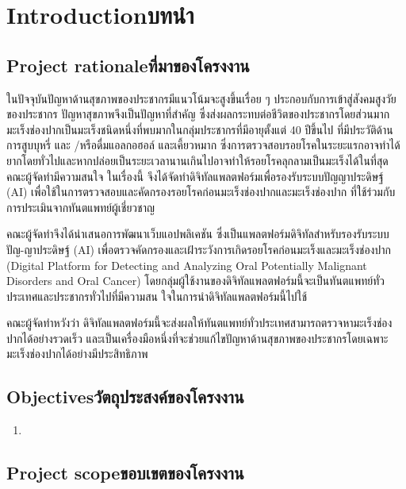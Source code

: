 \chapter{\ifenglish Introduction\else บทนำ\fi}

\section{\ifenglish Project rationale\else ที่มาของโครงงาน\fi}

ในปัจจุบันปัญหาด้านสุขภาพของประชากรมีแนวโน้มจะสูงขึ้นเรื่อย ๆ ประกอบกับการเข้าสู่สังคมสูงวัยของประชากร ปัญหาสุขภาพจึงเป็นปัญหาที่สำคัญ ซึ่งส่งผลกระทบต่อชีวิตของประชากรโดยส่วนมาก มะเร็งช่องปากเป็นมะเร็งชนิดหนึ่งที่พบมากในกลุ่มประชากรที่มีอายุตั้งแต่ 40 ปีขึ้นไป ที่มีประวัติด้านการสูบบุหรี่ และ
/หรือดื่มแอลกอฮอล์ และเคี้ยวหมาก ซึ่งการตรวจสอบรอยโรคในระยะแรกอาจทำได้ยากโดยทั่วไปและหากปล่อยเป็นระยะเวลานานเกินไปอาจทำให้รอยโรคลุกลามเป็นมะเร็งได้ในที่สุด คณะผู้จัดทำมีความสนใจ
ในเรื่องนี้ จึงได้จัดทำดิจิทัลแพลตฟอร์มเพื่อรองรับระบบปัญญาประดิษฐ์ (AI) เพื่อใช้ในการตรวจสอบและคัดกรองรอยโรคก่อนมะเร็งช่องปากและมะเร็งช่องปาก ที่ใช้ร่วมกับการประเมินจากทันตแพทย์ผู้เชี่ยวชาญ
    
คณะผู้จัดทำจึงได้นำเสนอการพัฒนาเว็บแอปพลิเคชัน ซึ่งเป็นแพลตฟอร์มดิจิทัลสำหรับรองรับระบบปัญ-ญาประดิษฐ์ (AI) เพื่อตรวจคัดกรองและเฝ้าระวังการเกิดรอยโรคก่อนมะเร็งและมะเร็งช่องปาก (Digital Platform for Detecting and Analyzing Oral Potentially Malignant Disorders and Oral Cancer) โดยกลุ่มผู้ใช้งานของดิจิทัลแพลตฟอร์มนี้จะเป็นทันตแพทย์ทั่วประเทศและประชากรทั่วไปที่มีความสน ใจในการนำดิจิทัลแพลตฟอร์มนี้ไปใช้
    
คณะผู้จัดทำหวังว่า ดิจิทัลแพลตฟอร์มนี้จะส่งผลให้ทันตแพทย์ทั่วประเทศสามารถตรวจหามะเร็งช่องปากได้อย่างรวดเร็ว และเป็นเครื่องมือหนึ่งที่จะช่วยแก้ไขปัญหาด้านสุขภาพของประชากรโดยเฉพาะมะเร็งช่องปากได้อย่างมีประสิทธิภาพ    


\section{\ifenglish Objectives\else วัตถุประสงค์ของโครงงาน\fi}
\begin{enumerate}
    \item
\end{enumerate}

\section{\ifenglish Project scope\else ขอบเขตของโครงงาน\fi}

